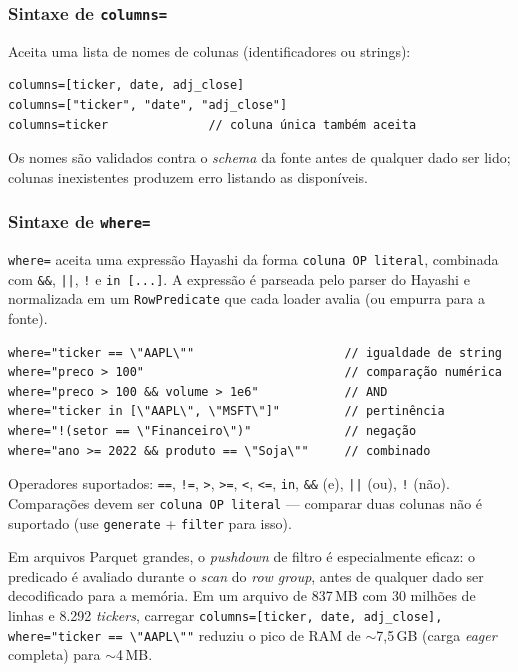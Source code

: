 \subsubsection*{Sintaxe de \texttt{columns=}}

Aceita uma lista de nomes de colunas (identificadores ou strings):

\begin{lstlisting}
columns=[ticker, date, adj_close]
columns=["ticker", "date", "adj_close"]
columns=ticker              // coluna única também aceita
\end{lstlisting}

Os nomes são validados contra o \textit{schema} da fonte antes de qualquer
dado ser lido; colunas inexistentes produzem erro listando as disponíveis.

\subsubsection*{Sintaxe de \texttt{where=}}

\texttt{where=} aceita uma expressão Hayashi da forma \texttt{coluna OP literal},
combinada com \texttt{\&\&}, \texttt{||}, \texttt{!} e \texttt{in [...]}.
A expressão é parseada pelo parser do Hayashi e normalizada em um
\texttt{RowPredicate} que cada loader avalia (ou empurra para a fonte).

\begin{lstlisting}
where="ticker == \"AAPL\""                     // igualdade de string
where="preco > 100"                            // comparação numérica
where="preco > 100 && volume > 1e6"            // AND
where="ticker in [\"AAPL\", \"MSFT\"]"         // pertinência
where="!(setor == \"Financeiro\")"             // negação
where="ano >= 2022 && produto == \"Soja\""     // combinado
\end{lstlisting}

Operadores suportados: \texttt{==}, \texttt{!=}, \texttt{>}, \texttt{>=},
\texttt{<}, \texttt{<=}, \texttt{in}, \texttt{\&\&} (e), \texttt{||} (ou),
\texttt{!} (não). Comparações devem ser \texttt{coluna OP literal} ---
comparar duas colunas não é suportado (use \texttt{generate} + \texttt{filter}
para isso).

\begin{nota}
  Em arquivos Parquet grandes, o \textit{pushdown} de filtro é especialmente
  eficaz: o predicado é avaliado durante o \textit{scan} do \textit{row group},
  antes de qualquer dado ser decodificado para a memória. Em um arquivo de
  837\,MB com 30 milhões de linhas e 8.292 \textit{tickers}, carregar
  \texttt{columns=[ticker, date, adj\_close], where="ticker == \textbackslash"AAPL\textbackslash""}
  reduziu o pico de RAM de $\sim$7{,}5\,GB (carga \textit{eager} completa) para
  $\sim$4\,MB.
\end{nota}

